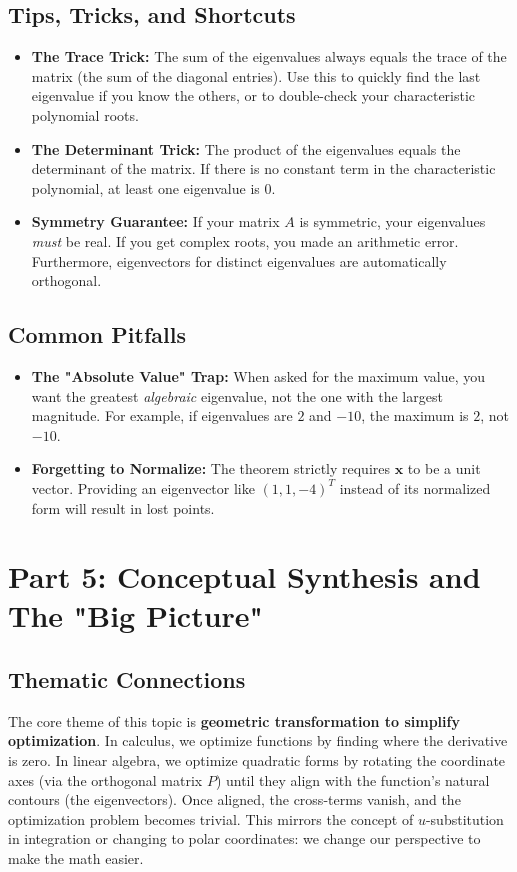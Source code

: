 \documentclass[11pt, letterpaper]{article}
\theoremstyle{definition}
\theoremstyle{remark}
\begin{document}
\subsection{Tips, Tricks, and Shortcuts}
\begin{itemize}
    \item \textbf{The Trace Trick:} The sum of the eigenvalues always equals the trace of the matrix (the sum of the diagonal entries). Use this to quickly find the last eigenvalue if you know the others, or to double-check your characteristic polynomial roots.
    \item \textbf{The Determinant Trick:} The product of the eigenvalues equals the determinant of the matrix. If there is no constant term in the characteristic polynomial, at least one eigenvalue is 0.
    \item \textbf{Symmetry Guarantee:} If your matrix $A$ is symmetric, your eigenvalues \textit{must} be real. If you get complex roots, you made an arithmetic error. Furthermore, eigenvectors for distinct eigenvalues are automatically orthogonal.
\end{itemize}

\subsection{Common Pitfalls}
\begin{itemize}
    \item \textbf{The "Absolute Value" Trap:} When asked for the maximum value, you want the greatest \textit{algebraic} eigenvalue, not the one with the largest magnitude. For example, if eigenvalues are $2$ and $-10$, the maximum is $2$, not $-10$.
    \item \textbf{Forgetting to Normalize:} The theorem strictly requires $\mathbf{x}$ to be a unit vector. Providing an eigenvector like $(1, 1, -4)^T$ instead of its normalized form will result in lost points.
\end{itemize}

\newpage

\section{Part 5: Conceptual Synthesis and The "Big Picture"}

\subsection{Thematic Connections}
The core theme of this topic is \textbf{geometric transformation to simplify optimization}. In calculus, we optimize functions by finding where the derivative is zero. In linear algebra, we optimize quadratic forms by rotating the coordinate axes (via the orthogonal matrix $P$) until they align with the function's natural contours (the eigenvectors). Once aligned, the cross-terms vanish, and the optimization problem becomes trivial. This mirrors the concept of $u$-substitution in integration or changing to polar coordinates: we change our perspective to make the math easier.
\end{document}
